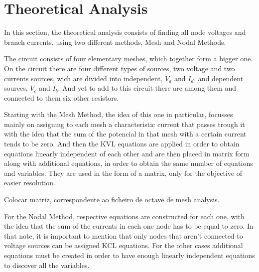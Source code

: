 \section{Theoretical Analysis}
\label{sec:analysis}

In this section, the theoretical analysis consists of finding all node voltages and branch currents, using two different methods, Mesh and Nodal Methods.  

The circuit consists of four elementary meshes, which together form a bigger one. On the circuit there are four different types of sources, two voltage and two currents sources, wich are divided into independent, $V_a$ and $I_d$, and dependent sources, $V_c$ and $I_b$. And yet to add to this circuit there are among them and connected to them six other resistors.

\vspace {1cm}
Starting with the Mesh Method, the idea of this one in particular, focusses mainly on assigning to each mesh a characteristic current that passes trough it with the idea that the sum of the potencial in that mesh with a certain current tends to be zero. And then the KVL equations are applied in order to obtain equations linearly independent of each other and are then placed in matrix form along with additional equations, in order to obtain the same number of equations and variables. They are used in the form of a matrix, only for the objective of easier resolution.  

\vspace {1cm}
Colocar matriz, correspondente ao ficheiro de octave de mesh analysis. 
\vspace{1cm}



For the Nodal Method, respective equations are constructed for each one, with the idea that the sum of the currents in each one node has to be equal to zero. In that note, it is important to mention that only nodes that aren't connected to voltage sources can be assigned KCL equations. For the other cases additional equations must be created in order to have enough linearly independent equations to discover all the variables. 

